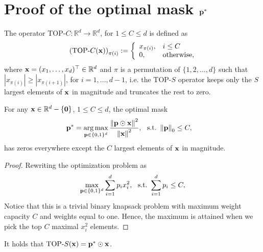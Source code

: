 \newpage
\appendix
\onecolumn

\section{Proof of the optimal mask $\mathbf{p}^*$}\label{sec_appx:proof_mask}
\begin{definition}\label{def:tops}
The operator TOP-$C: \mathbb{R}^d \rightarrow \mathbb{R}^d$, for $1 \leq C \leq d$ is defined as
\begin{equation}\
    \left( \text{TOP-}C(\mathbf{x}) \right)_{\pi(i)} := \left\{
\begin{array}{ll}
      x_{\pi(i)}, & i \leq C \\
      0, & \text{otherwise},\\
\end{array} 
\right. \nonumber
\end{equation}
where $\mathbf{x} = (x_1, \ldots, x_d)^{\top} \in \mathbb{R}^d$ and $\pi$ is a permutation of $\{1, 2, \ldots, d \}$ such that $|x_{\pi(i)}| \geq |x_{\pi(i+1)}|$, for $i=1, \ldots, d-1$, i.e. the TOP-$S$ operator keeps only the $S$ largest elements of $\mathbf{x}$ in magnitude and truncates the rest to zero.
\end{definition}

\begin{lemma}\label{lemma:max_norm}
For any $\mathbf{x} \in \mathbb{R}^d-\{ \mathbf{0}\}$, $1 \leq C \leq d$, the optimal mask
\begin{align}
     \mathbf{p}^* & =  \operatorname*{arg\,max}_{\mathbf{p} \in \{0, 1 \}^d} \frac{\left\lVert\mathbf{p} \odot \mathbf{x} \right\rVert^2}{\left\lVert\mathbf{x}\right\rVert^2},~~\text{s.t.}~\left\lVert\mathbf{p}\right\rVert_0 \leq C,  \nonumber
\end{align}
has zeros everywhere except the $C$ largest elements of $\mathbf{x}$ in magnitude.
\begin{proof}
    Rewriting the optimization problem as 
    \begin{equation}
        \max_{\mathbf{p} \in \{0, 1 \}^d} \sum_{i=1}^d p_i x_i^2,~~ \text{s.t.}~\sum_{i=1}^d p_i \leq C \nonumber,
    \end{equation}
    Notice that this is a trivial binary knapsack problem with maximum weight capacity $C$ and weights equal to one. Hence, the maximum is attained when we pick the top $C$ maximal $x_i^2$ elements. 
\end{proof}
\end{lemma}

\begin{remark}

\end{remark} It holds that $\text{TOP-}S(\mathbf{x}) = \mathbf{p}^* \odot \mathbf{x}$.


